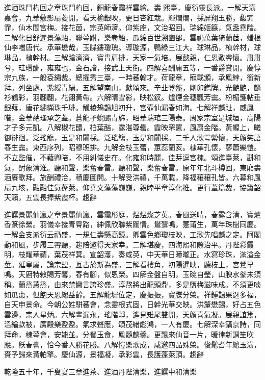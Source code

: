 \begin{pinyinscope}
進酒珠鬥杓回之章珠鬥杓回，銅龍春靄祥雲繪。壽熙臺，慶衍靈長派。一解天潢嘉會，九華敷影扇菱開。看天榆銀映，更日杏紅栽。輝爛爛，採屏翔玉勝，馥霏霏，仙木間宮梅。接花茵，宗英師濟。仰紫座，文治昭回。瑞綿姬籙，氣盎堯階。二解化日舒遲景蕩駘，聯萼跗，樂耇鮐，瓜綿百世溯豳邰。雲礽萬葉猗蘭茝，蟠根仙李嗤唐代。承華懋哉，玉牒鏤瓊瑰。導璇源，鴨綠三江大。球琳品，楨幹材，球琳品，楨幹材。三解蹌濟濟，寶胄肩排，天家一氣培。展懿親，仁恩敷睿懷。肅肅兮，珪瓚酬，雍雍也，金石諧，接武上天街。四解喜酬庸五等，一番爵賞開。慶惇宗九族，一般袞繡裁。總擢秀三臺，一時蕃翰才。荷龍章，寵載頒，承鳳綍，銜新拜。列坐處，紫綬青緺。五解望南山，獻頌來。辛韭登盤，剛卯鐫牌。光艷艷，麟衫鶴彩，羽翩翩，花翎黃帶。六解晴雪影，映松釵。爐煙金穗飄芳靄。枌楣箋帖垂銀薤，唐花繡纈珠千琲。觚棱鳷鵲旭初升，宮壺仙漏春如海。七解祥麟趾，威鳳喈，金華葩瑵承芝蓋。蒼龍孑蜺颺青旆，昭華瑞琯三陽泰。周家宗室是城垣，高陽才子多元凱。八解椒花醴，柏葉醅，露湛尊罍。霞映罘罳，風扇金階。黃幄上，曦御徘徊。泛瑤觴，玉是和闐採。泛瑤觴，玉是和闐採。二千人歌咢縈懷，天顏笑語春生靄。東西序列，昭穆班排。九解金枝玉蕾，蕙蕊蘭荄。棣華孔懷，蓼蕭樂愷。不立監催，不藉卿陪，不用糾儀史在。化雍和時麗，佳芽逗宮槐。頌進臺萊，斟和氣，酎象清淮。聽和聲，樂奮春雷。聽和聲，樂奮春雷。原年年北斗樽回，東廂壽酒賡歌拜。旅酬禮洽，積慶圖開。十解受洪禧，千萬載，降福穰穰孔皆。六幕和風扇九垓，融融佳氣蓬萊。仰堯文蕩蕩巍巍，親睦平章淳化推。更行葦篇裁，協簫韶天籟，五雲長捧紫霞杯。趨辭

進饌景麗仙瀛之章景麗仙瀛，雲靄彤庭，煜煜燦芝英。春風送晴，春露含清，寶爐香篆徐縈。羽儀幸接青霄路，紳佩欣聯紫闥情。鸑鷟鳴，萐莆生，萬年珠樹同慶。一解金支派衍云礽盛，一規仁壽懸高鏡。卿雲色鄉瓊枝映，工歌先唱麟之定。阿閣動和風，步履三霄聽，趨陪邀得天家幸。二解堪慶，四海熙和際治平。丹陛彩霞明，枝耀華蘋，葉茂祥蓂。宣韶濩，奏咸英，中天華日曈曨正。水寫珍珠，滿溢金莖。延皇屬，論宗盟，亙古於斯為盛。三解看樓角，初陽暹映，聽枝上，宮鶯早鳴。天廚特敕賜芳馨，春有腳，似恩榮。四解金盤自明，玉碗自瑩，山腴水豢未須稱。蘭烝蕙烝，由來禁臠言誇珍盛。淳熬將出龍頭鼎，多是鹽梅滋味成。不須更啖如瓜棗，但飽天恩總益齡。五解龍墀位定，慶振振，寶牒分榮。祥鍾鵲果迓多福，自天申景命。今朝公姓駢蕃會，念靈根式固，日幹光華交映。洪釐懋錫，好占五色雲邊，宗人星炳。六解晝漏永，瑤階靜，遙見雉尾雙開，天顏喜氣凝。展親誼篤，溫綸款被，廣殿樂盈盈。氣求聲應，頌茂緒彪鴻，一人有慶。七解深幸鎬京詩，同拜命，棣萼會，安能並。分餐玉食，鳳髓麟羹。更飄來仙音一片，暖律新調笙吹應。飫春膏，恰今番人勝花勝。八解愷樂歌成，咸邀四品殊榮。俊髦耆年總玉潢，賚予歸來黃帕擎。慶仙源，景福凝，承彩雲，長護蓬萊頂。趨辭

乾隆五十年，千叟宴三章進茶、進酒丹陛清樂，進饌中和清樂


\end{pinyinscope}
